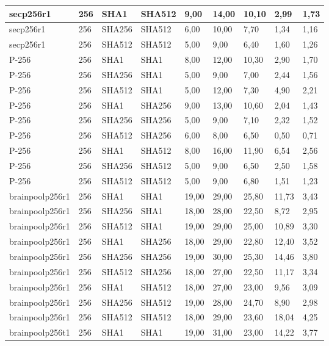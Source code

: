 \begin{longtable}{| l | l | l | l | l |l |l |l |l |}
secp256r1 & 256 & SHA1 & SHA512 & 9,00 & 14,00 & 10,10 & 2,99 & 1,73 \\ \hline 
secp256r1 & 256 & SHA256 & SHA512 & 6,00 & 10,00 & 7,70 & 1,34 & 1,16 \\ \hline 
secp256r1 & 256 & SHA512 & SHA512 & 5,00 & 9,00 & 6,40 & 1,60 & 1,26 \\ \hline 
P-256 & 256 & SHA1 & SHA1 & 8,00 & 12,00 & 10,30 & 2,90 & 1,70 \\ \hline 
P-256 & 256 & SHA256 & SHA1 & 5,00 & 9,00 & 7,00 & 2,44 & 1,56 \\ \hline 
P-256 & 256 & SHA512 & SHA1 & 5,00 & 12,00 & 7,30 & 4,90 & 2,21 \\ \hline 
P-256 & 256 & SHA1 & SHA256 & 9,00 & 13,00 & 10,60 & 2,04 & 1,43 \\ \hline 
P-256 & 256 & SHA256 & SHA256 & 5,00 & 9,00 & 7,10 & 2,32 & 1,52 \\ \hline 
P-256 & 256 & SHA512 & SHA256 & 6,00 & 8,00 & 6,50 & 0,50 & 0,71 \\ \hline 
P-256 & 256 & SHA1 & SHA512 & 8,00 & 16,00 & 11,90 & 6,54 & 2,56 \\ \hline 
P-256 & 256 & SHA256 & SHA512 & 5,00 & 9,00 & 6,50 & 2,50 & 1,58 \\ \hline 
P-256 & 256 & SHA512 & SHA512 & 5,00 & 9,00 & 6,80 & 1,51 & 1,23 \\ \hline 
brainpoolp256r1 & 256 & SHA1 & SHA1 & 19,00 & 29,00 & 25,80 & 11,73 & 3,43 \\ \hline 
brainpoolp256r1 & 256 & SHA256 & SHA1 & 18,00 & 28,00 & 22,50 & 8,72 & 2,95 \\ \hline 
brainpoolp256r1 & 256 & SHA512 & SHA1 & 19,00 & 29,00 & 25,00 & 10,89 & 3,30 \\ \hline 
brainpoolp256r1 & 256 & SHA1 & SHA256 & 18,00 & 29,00 & 22,80 & 12,40 & 3,52 \\ \hline 
brainpoolp256r1 & 256 & SHA256 & SHA256 & 19,00 & 30,00 & 25,30 & 14,46 & 3,80 \\ \hline 
brainpoolp256r1 & 256 & SHA512 & SHA256 & 18,00 & 27,00 & 22,50 & 11,17 & 3,34 \\ \hline 
brainpoolp256r1 & 256 & SHA1 & SHA512 & 18,00 & 27,00 & 23,00 & 9,56 & 3,09 \\ \hline 
brainpoolp256r1 & 256 & SHA256 & SHA512 & 19,00 & 28,00 & 24,70 & 8,90 & 2,98 \\ \hline 
brainpoolp256r1 & 256 & SHA512 & SHA512 & 18,00 & 29,00 & 23,60 & 18,04 & 4,25 \\ \hline 
brainpoolp256t1 & 256 & SHA1 & SHA1 & 19,00 & 31,00 & 23,00 & 14,22 & 3,77 \\ \hline 

\end{longtable}
